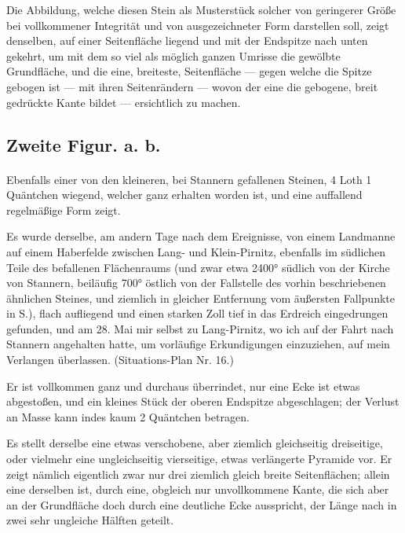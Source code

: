 \documentclass[a4paper, 11pt, oneside, german]{article}
\begin{document}
Die Abbildung, welche diesen Stein als Musterstück solcher von geringerer Größe bei vollkommener Integrität und von ausgezeichneter Form darstellen soll, zeigt denselben, auf einer Seitenfläche liegend und mit der Endspitze nach unten gekehrt, um mit dem so viel als möglich ganzen Umrisse die gewölbte Grundfläche, und die eine, breiteste, Seitenfläche --- gegen welche die Spitze gebogen ist --- mit ihren Seitenrändern --- wovon der eine die gebogene, breit gedrückte Kante bildet --- ersichtlich zu machen.

\subsection{Zweite Figur. a. b.}
\paragraph{}
Ebenfalls einer von den kleineren, bei Stannern gefallenen Steinen, 4 Loth 1 Quäntchen wiegend, welcher ganz erhalten worden ist, und eine auffallend regelmäßige Form zeigt.

Es wurde derselbe, am andern Tage nach dem Ereignisse, von einem Landmanne auf einem Haberfelde zwischen Lang- und Klein-Pirnitz, ebenfalls im südlichen Teile des befallenen Flächenraums (und zwar etwa 2400° südlich von der Kirche von Stannern, beiläufig 700° östlich von der Fallstelle des vorhin beschriebenen ähnlichen Steines, und ziemlich in gleicher Entfernung vom äußersten Fallpunkte in S.), flach aufliegend und einen starken Zoll tief in das Erdreich eingedrungen gefunden, und am 28. Mai mir selbst zu Lang-Pirnitz, wo ich auf der Fahrt nach Stannern angehalten hatte, um vorläufige Erkundigungen einzuziehen, auf mein Verlangen überlassen. (Situations-Plan Nr. 16.)

Er ist vollkommen ganz und durchaus überrindet, nur eine Ecke ist etwas abgestoßen, und ein kleines Stück der oberen Endspitze abgeschlagen; der Verlust an Masse kann indes kaum 2 Quäntchen betragen.

Es stellt derselbe eine etwas verschobene, aber ziemlich gleichseitig dreiseitige, oder vielmehr eine ungleichseitig vierseitige, etwas verlängerte Pyramide vor. Er zeigt nämlich eigentlich zwar nur drei ziemlich gleich breite Seitenflächen; allein eine derselben ist, durch eine, obgleich nur unvollkommene Kante, die sich aber an der Grundfläche doch durch eine deutliche Ecke ausspricht, der Länge nach in zwei sehr ungleiche Hälften geteilt.
\end{document}
